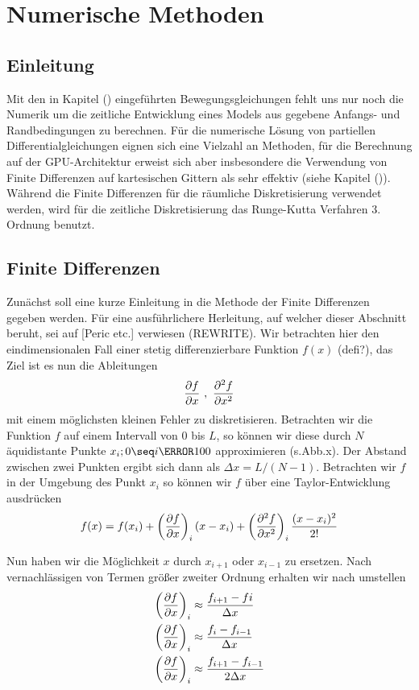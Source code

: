 \chapter{Numerische Methoden}

\section{Einleitung}

Mit den in Kapitel () eingeführten Bewegungsgleichungen fehlt uns nur noch die Numerik um die zeitliche Entwicklung eines Models aus
gegebene Anfangs- und Randbedingungen zu berechnen.
Für die numerische Lösung von partiellen Differentialgleichungen eignen sich eine Vielzahl an Methoden, für die Berechnung auf
der GPU-Architektur erweist sich aber insbesondere die Verwendung von Finite Differenzen  auf kartesischen Gittern
als sehr effektiv (siehe Kapitel ()).
Während die Finite Differenzen für die räumliche Diskretisierung verwendet werden, wird für die zeitliche Diskretisierung
das Runge-Kutta Verfahren 3. Ordnung benutzt.


\section{Finite Differenzen}
 Zunächst soll eine kurze Einleitung in die Methode der Finite Differenzen gegeben werden.
 Für eine ausführlichere Herleitung, auf welcher dieser Abschnitt beruht, sei  auf [Peric etc.] verwiesen (REWRITE).
 Wir betrachten hier den eindimensionalen Fall einer stetig differenzierbare Funktion $f(x)$ (defi?), das Ziel ist es nun die Ableitungen
\begin{align}
\pdn[f]{x} \ , \ \pdn[^2f]{x^2}
\end{align}
 mit einem möglichsten kleinen Fehler zu diskretisieren.
Betrachten wir die Funktion $f$ auf einem Intervall von 0 bis $L$, so können wir diese durch $N$ äquidistante Punkte $x_i; 0 \seq i \s 100$ approximieren (s.Abb.x).
Der Abstand zwischen zwei Punkten ergibt sich dann als $\Delta x = L/(N - 1)$.
Betrachten wir $f$ in der Umgebung des Punkt $x_i$ so können wir $f$ über eine Taylor-Entwicklung ausdrücken
\begin{align}
    f(x) = f(x_i) + \left(\pdn[f]{x} \right)_i (x - x_i) + \left(\pdn[^2f]{x^2}\right)_i \frac{(x-x_i)^2}{2!}
\end{align}

Nun haben wir die Möglichkeit $x$ durch $x_{i+1}$ oder $x_{i-1}$ zu ersetzen. Nach vernachlässigen von Termen größer zweiter Ordnung erhalten wir nach umstellen
\begin{align}
    \left(\pdn[f]{x}\right)_i &\approx \frac{f_{i+1} - f{i}}{\Delta x}\\
    \left(\pdn[f]{x}\right)_i &\approx \frac{f_{i} - f_{i-1}}{\Delta x}\\
    \left(\pdn[f]{x}\right)_i &\approx \frac{f_{i+1} - f_{i-1}}{2\Delta x}
\end{align}

